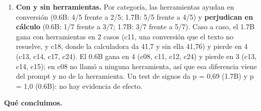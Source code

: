 \begin{enumerate}
\item
  \textbf{Con y sin herramientas.} Por categoría, las herramientas ayudan en conversión (0.6B: 4/5 frente
  a 2/5; 1.7B: 5/5 frente a 4/5) y \textbf{perjudican en cálculo} (0.6B: 1/7 frente a 3/7; 1.7B: 3/7
  frente a 5/7). Caso a caso, el 1.7B gana con herramientas en 2 casos (c11, una conversión que
  el texto no resuelve, y c18, donde la calculadora da 41,7 y sin ella 41,76) y pierde en 4
  (c13, c14, c17, c24). El 0.6B gana en 4 (c08, c11, c12, c24) y pierde en 3 (c13, c14, c15); en
  c08 no llamó a ninguna herramienta, así que esa diferencia viene del prompt y no de la
  herramienta. Un test de signos da p = 0,69 (1.7B) y p = 1,0 (0.6B): no hay evidencia de efecto.
\end{enumerate}

\textbf{Qué concluimos.}

